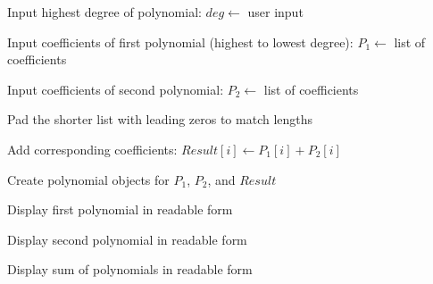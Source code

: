 \begin{algorithm}
\caption{Addition of Two Polynomials Represented Using Coefficient Lists}
\begin{algorithmic}[1]

\STATE Input highest degree of polynomial:
\STATE $deg \gets$ user input

\STATE Input coefficients of first polynomial (highest to lowest degree):
\STATE $P_1 \gets$ list of coefficients

\STATE Input coefficients of second polynomial:
\STATE $P_2 \gets$ list of coefficients

\STATE Pad the shorter list with leading zeros to match lengths

\STATE Add corresponding coefficients:
\STATE $Result[i] \gets P_1[i] + P_2[i]$

\STATE Create polynomial objects for $P_1$, $P_2$, and $Result$

\STATE Display first polynomial in readable form

\STATE Display second polynomial in readable form

\STATE Display sum of polynomials in readable form

\end{algorithmic}
\end{algorithm}